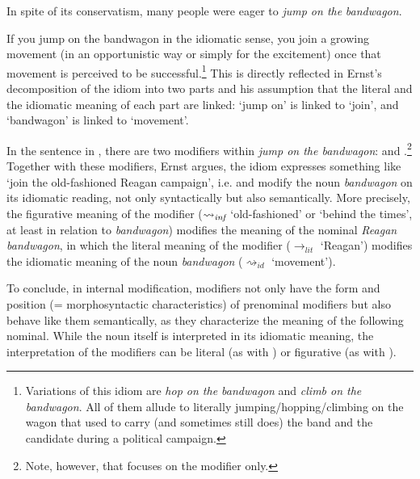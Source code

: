\documentclass[output=paper]{langsci/langscibook}
\begin{document}
\ea \label{Reagan bandwagon}
In spite of its conservatism, many people were eager to \textit{jump on the} \underline{} 
\underline{} \textit{bandwagon}.
\z

\noindent If you jump on the bandwagon in the idiomatic sense, you join a growing movement (in an opportunistic way or simply for the excitement) once that movement is perceived to be successful.\footnote{Variations of this idiom are \textit{hop on the bandwagon} and \textit{climb on the bandwagon}. All of them allude to literally jumping/hopping/climbing on the wagon that used to carry (and sometimes still does) the band and the candidate during a political campaign.}
This is directly reflected in Ernst's decomposition of the idiom into two parts and his assumption that the literal and the idiomatic meaning of each part are linked:  `jump on' is linked to `join', and `bandwagon' is linked to `movement'.

\begin{sloppypar}
  In the sentence in , there are two modifiers
  within \textit{jump on the bandwagon}: \underline{}
  and \underline{}.\footnote{Note, however, that
    \citet{ernst81} focuses on the modifier
    \underline{} only.}  Together with these
  modifiers, Ernst argues, the idiom expresses something like `join
  the old-fashioned Reagan campaign', i.e.\@
  \underline{} and \underline{}
  modify the noun \textit{bandwagon} on its idiomatic reading, not
  only syntactically but also semantically. More precisely, the
  figurative meaning of the modifier \underline{}
  ($\rightsquigarrow_{\text{\itshape inf}}$ `old-fashioned' or `behind
  the times', at least in relation to \textit{bandwagon}) modifies the
  meaning of the nominal \textit{Reagan bandwagon}, in which the
  literal meaning of the modifier \underline{}
  ($\rightarrow_{lit}$ `Reagan') modifies the idiomatic meaning of the
  noun \textit{bandwagon} ($\rightsquigarrow_{id}$ `movement').
\end{sloppypar}

To conclude, in internal modification, modifiers %
not only have the form and position (= morphosyntactic characteristics) of prenominal modifiers but also behave like them semantically, as they characterize the meaning of the following nominal. While the noun itself is interpreted in its idiomatic meaning, the interpretation of the modifiers can be literal (as with \underline{}) or figurative (as with \underline{}).
\end{document}
